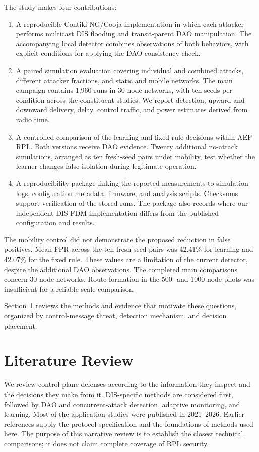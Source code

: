 \documentclass[journal]{IEEEtran}
\begin{document}
The study makes four contributions:
\begin{enumerate}
\item A reproducible Contiki-NG/Cooja implementation in which each attacker performs multicast DIS flooding and transit-parent DAO manipulation. The accompanying local detector combines observations of both behaviors, with explicit conditions for applying the DAO-consistency check.
\item A paired simulation evaluation covering individual and combined attacks, different attacker fractions, and static and mobile networks. The main campaign contains 1,960 runs in 30-node networks, with ten seeds per condition across the constituent studies. We report detection, upward and downward delivery, delay, control traffic, and power estimates derived from radio time.
\item A controlled comparison of the learning and fixed-rule decisions within AEF-RPL. Both versions receive DAO evidence. Twenty additional no-attack simulations, arranged as ten fresh-seed pairs under mobility, test whether the learner changes false isolation during legitimate operation.
\item A reproducibility package linking the reported measurements to simulation logs, configuration metadata, firmware, and analysis scripts. Checksums support verification of the stored runs. The package also records where our independent DIS-FDM implementation differs from the published configuration and results.
\end{enumerate}

The mobility control did not demonstrate the proposed reduction in false positives. Mean FPR across the ten fresh-seed pairs was 42.41\% for learning and 42.07\% for the fixed rule. These values are a limitation of the current detector, despite the additional DAO observations. The completed main comparisons concern 30-node networks. Route formation in the 500- and 1000-node pilots was insufficient for a reliable scale comparison.

Section~\ref{sec:related} reviews the methods and evidence that motivate these questions, organized by control-message threat, detection mechanism, and decision placement.

\section{Literature Review}\label{sec:related}
We review control-plane defenses according to the information they inspect and the decisions they make from it. DIS-specific methods are considered first, followed by DAO and concurrent-attack detection, adaptive monitoring, and learning. Most of the application studies were published in 2021--2026. Earlier references supply the protocol specification and the foundations of methods used here. The purpose of this narrative review is to establish the closest technical comparisons; it does not claim complete coverage of RPL security.
\end{document}
